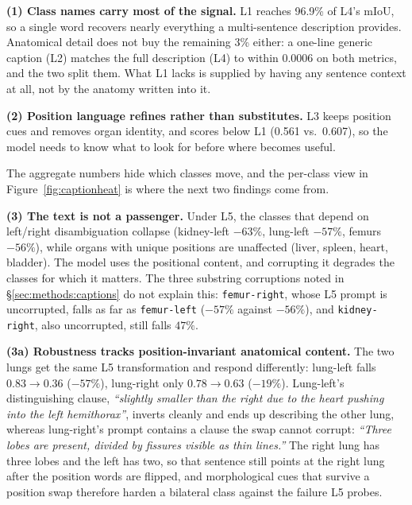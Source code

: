 \documentclass[10pt]{article}
\newcommand{\org}[1]{\texttt{#1}}
\begin{document}
\textbf{(1) Class names carry most of the signal.} L1 reaches 96.9\% of L4's
mIoU, so a single word recovers nearly everything a multi-sentence description
provides. Anatomical detail does not buy the remaining 3\% either: a one-line
generic caption (L2) matches the full description (L4) to within 0.0006 on both
metrics, and the two split them. What L1 lacks is supplied by having any sentence
context at all, not by the anatomy written into it.

\textbf{(2) Position language refines rather than substitutes.} L3 keeps position
cues and removes organ identity, and scores below L1 (0.561 vs.\ 0.607), so the
model needs to know what to look for before where becomes useful.

The aggregate numbers hide which classes move, and the per-class view in
Figure~\ref{fig:captionheat} is where the next two findings come from.

\textbf{(3) The text is not a passenger.} Under L5, the classes that depend on
left/right disambiguation collapse (kidney-left $-63\%$, lung-left $-57\%$, femurs
$-56\%$), while organs with unique positions are unaffected (liver, spleen, heart,
bladder). The model uses the positional content, and corrupting it degrades the
classes for which it matters. The three substring corruptions noted in
\S\ref{sec:methods:captions} do not explain this: \org{femur-right}, whose L5
prompt is uncorrupted, falls as far as \org{femur-left} ($-57\%$ against
$-56\%$), and \org{kidney-right}, also uncorrupted, still falls $47\%$.

\textbf{(3a) Robustness tracks position-invariant anatomical content.} The two
lungs get the same L5 transformation and respond differently: lung-left falls
$0.83\to0.36$ ($-57\%$), lung-right only $0.78\to0.63$ ($-19\%$). Lung-left's
distinguishing clause, \emph{``slightly smaller than the right due to the heart
pushing into the left hemithorax''}, inverts cleanly and ends up describing the
other lung, whereas lung-right's prompt contains a clause the swap cannot corrupt:
\emph{``Three lobes are present, divided by fissures visible as thin lines.''} The
right lung has three lobes and the left has two, so that sentence still points at
the right lung after the position words are flipped, and morphological cues that
survive a position swap therefore harden a bilateral class against the failure L5
probes.
\end{document}
